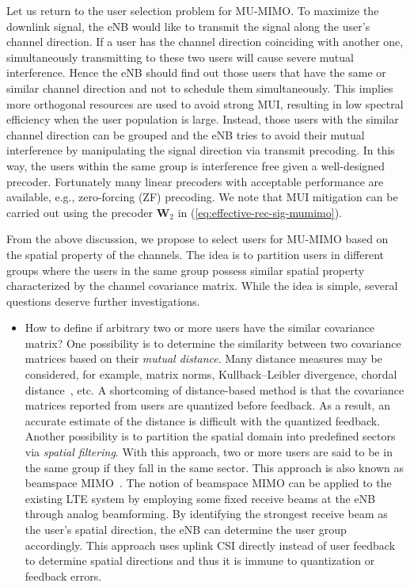 \documentclass[a4paper,12pt]{article}%
\begin{document}
Let us return to the user selection problem for MU-MIMO. To maximize the downlink signal, the eNB would like to transmit the signal along the user's channel direction. If a user has the channel direction coinciding with another one, simultaneously transmitting to these two users will cause severe mutual interference. Hence the eNB should find out those users that have the same or similar channel direction and not to schedule them simultaneously. This implies more orthogonal resources are used to avoid strong MUI, resulting in low spectral efficiency when the user population is large. Instead, those users with the similar channel direction can be grouped and the eNB tries to avoid their mutual interference by manipulating the signal direction via transmit precoding. In this way, the users within the same group is interference free given a well-designed precoder. Fortunately many linear precoders with acceptable performance are available, e.g., zero-forcing (ZF) precoding. We note that MUI mitigation can be carried out using the precoder $\mathbf{W}_2$ in (\ref{eq:effective-rec-sig-mumimo}).

From the above discussion, we propose to select users for MU-MIMO based on the spatial property of the channels. The idea is to partition users in different groups where the users in the same group possess similar spatial property characterized by the channel covariance matrix. While the idea is simple, several questions deserve further investigations.

\begin{itemize}
\item How to define if arbitrary two or more users have the similar covariance matrix? One possibility is to determine the similarity between two covariance matrices based on their \emph{mutual distance}. Many distance measures may be considered, for example, matrix norms, Kullback–Leibler divergence, chordal distance~, etc. A shortcoming of distance-based method is that the covariance matrices reported from users are quantized before feedback. As a result, an accurate estimate of the distance is difficult with the quantized feedback. Another possibility is to partition the spatial domain into predefined sectors via \emph{spatial filtering}. With this approach, two or more users are said to be in the same group if they fall in the same sector. This approach is also known as beamspace MIMO~\cite{SayeedBrady2013}. The notion of beamspace MIMO can be applied to the existing LTE system by employing some fixed receive beams at the eNB through analog beamforming. By identifying the strongest receive beam as the user's spatial direction, the eNB can determine the user group accordingly. This approach uses uplink CSI directly instead of user feedback to determine spatial directions and thus it is immune to quantization or feedback errors.
\end{itemize}
\end{document}
